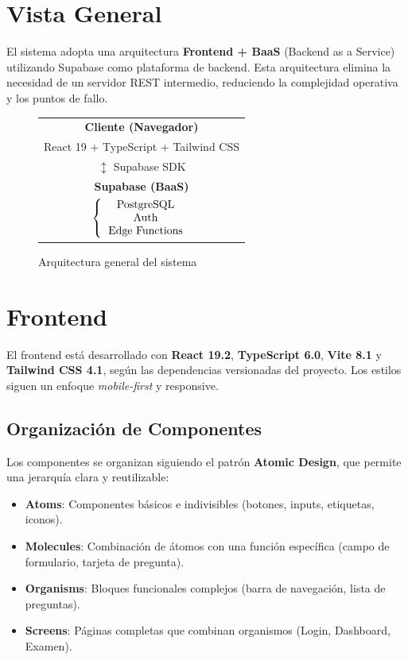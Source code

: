 \section{Vista General}

El sistema adopta una arquitectura \textbf{Frontend + BaaS} (Backend as a Service) utilizando Supabase como plataforma de backend. Esta arquitectura elimina la necesidad de un servidor REST intermedio, reduciendo la complejidad operativa y los puntos de fallo.

\begin{figure}[H]
\centering
\begin{minipage}{0.8\textwidth}
\centering
\ttfamily\footnotesize
\begin{tabular}{c}
\textbf{Cliente (Navegador)} \\
React 19 + TypeScript + Tailwind CSS \\
$\updownarrow$ Supabase SDK \\
\textbf{Supabase (BaaS)} \\
$\left\{\begin{tabular}{c}
PostgreSQL \\ Auth \\
Edge Functions
\end{tabular}\right.$
\end{tabular}
\end{minipage}
\caption{Arquitectura general del sistema}
\end{figure}

\section{Frontend}

El frontend está desarrollado con \textbf{React 19.2}, \textbf{TypeScript 6.0}, \textbf{Vite 8.1} y \textbf{Tailwind CSS 4.1}, según las dependencias versionadas del proyecto. Los estilos siguen un enfoque \textit{mobile-first} y responsive.

\subsection{Organización de Componentes}

Los componentes se organizan siguiendo el patrón \textbf{Atomic Design}, que permite una jerarquía clara y reutilizable:

\begin{itemize}
    \item \textbf{Atoms}: Componentes básicos e indivisibles (botones, inputs, etiquetas, iconos).
    \item \textbf{Molecules}: Combinación de átomos con una función específica (campo de formulario, tarjeta de pregunta).
    \item \textbf{Organisms}: Bloques funcionales complejos (barra de navegación, lista de preguntas).
    \item \textbf{Screens}: Páginas completas que combinan organismos (Login, Dashboard, Examen).
\end{itemize}

